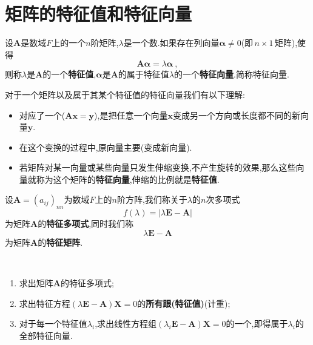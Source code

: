 \documentclass[9pt,a4paper]{book}
\begin{document}
\section{矩阵的特征值和特征向量}
\begin{defination}[特征值与特征向量的定义]
	设$ \bm{A} $是数域$ F $上的一个$ n $阶矩阵,$ \lambda $是一个数.如果存在列向量$\bm{\alpha}\neq 0  $(即\,$ n\times 1 $\,矩阵),使得
	\[ \bm{A}\bm{\alpha}=\lambda\bm{\alpha}\ , \]
	则称$ \lambda $是$\bm{A} $的一个\textbf{特征值},$ \bm{\alpha} $是$ \bm{A} $的属于特征值$ \lambda $的一个\textbf{特征向量}.简称特征向量.
\end{defination}
\begin{defination}[特征向量的几何意义]
	对于一个矩阵以及属于其某个特征值的特征向量我们有以下理解:
	\begin{itemize}
	\item {}对应了一个($\bm{A}\bm{x} = \bm{y}$),是把任意一个向量$ \bm{x} $变成另一个方向或长度都不同的新向量$ \bm{y} $.
	\item 在这个变换的过程中,原向量主要(变成新向量).
	\item 若矩阵对某一向量或某些向量只发生伸缩变换,不产生旋转的效果,那么这些向量就称为这个矩阵的\textbf{特征向量},伸缩的比例就是\textbf{特征值}. 
	\end{itemize}
\end{defination}
\begin{defination}
	设$ \bm{A}=(a_{ij})_{nn} $为数域$ F $上的$ n $阶方阵,我们称关于$ \lambda $的$ n $次多项式
	\[f(\lambda)=|\lambda\bm{E}-\bm{A}|\]
	为矩阵$ \bm{A} $的\textbf{特征多项式},同时我们称
	\[\lambda\bm{E}-\bm{A}\]
	为矩阵$ \bm{A} $的\textbf{特征矩阵}.
\end{defination}
\begin{method}[求矩阵特征值与特征向量的方法]
	\ \\
	\begin{enumerate}
		\item 求出矩阵$ \bm{A} $的特征多项式;
		\item 求出特征方程$ (\lambda\bm{E}-\bm{A})\bm{X}=0 $的\textbf{所有跟(特征值)}(计重);
		\item 对于每一个特征值$ \lambda_i $,求出线性方程组$ (\lambda_i\bm{E}-\bm{A})\bm{X}=0 $的一个,即得属于$ \lambda_i $的全部特征向量.
		\end{enumerate}
\end{method}
\end{document}
